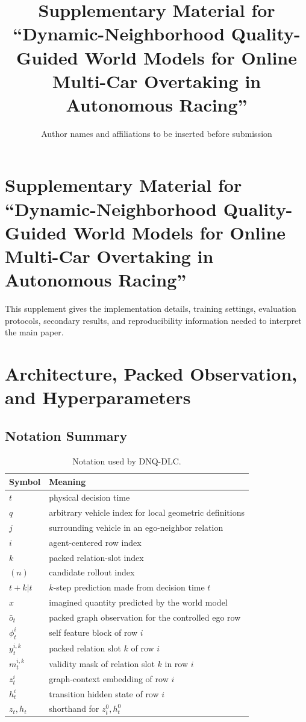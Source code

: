 \documentclass[journal]{IEEEtran}
\begin{document}
\title{Supplementary Material for ``Dynamic-Neighborhood Quality-Guided World Models for Online Multi-Car Overtaking in Autonomous Racing''}
\author{Author names and affiliations to be inserted before submission}
\maketitle

\section*{Supplementary Material for ``Dynamic-Neighborhood
Quality-Guided World Models for Online Multi-Car Overtaking in
Autonomous Racing''}

This supplement gives the implementation details, training settings,
evaluation protocols, secondary results, and reproducibility information
needed to interpret the main paper.

\section{Architecture, Packed Observation, and Hyperparameters}
\label{supp:arch}

\subsection{Notation Summary}
\label{supp:notation}

\begin{table}[t]
\centering
\caption{Notation used by DNQ-DLC.}
\label{tab:supp_notation}
\begin{tabular}{ll}
\hline
Symbol & Meaning \\
\hline
$t$ & physical decision time \\
$q$ & arbitrary vehicle index for local geometric definitions \\
$j$ & surrounding vehicle in an ego-neighbor relation \\
$i$ & agent-centered row index \\
$k$ & packed relation-slot index \\
$(n)$ & candidate rollout index \\
$t+k|t$ & $k$-step prediction made from decision time $t$ \\
$\hat{x}$ & imagined quantity predicted by the world model \\
$\bar{o}_t$ & packed graph observation for the controlled ego row \\
$\phi_t^i$ & self feature block of row $i$ \\
$y_t^{i,k}$ & packed relation slot $k$ of row $i$ \\
$m_t^{i,k}$ & validity mask of relation slot $k$ in row $i$ \\
$z_t^i$ & graph-context embedding of row $i$ \\
$h_t^i$ & transition hidden state of row $i$ \\
$z_t,h_t$ & shorthand for $z_t^0,h_t^0$ \\
\hline
\end{tabular}
\end{table}
\end{document}
